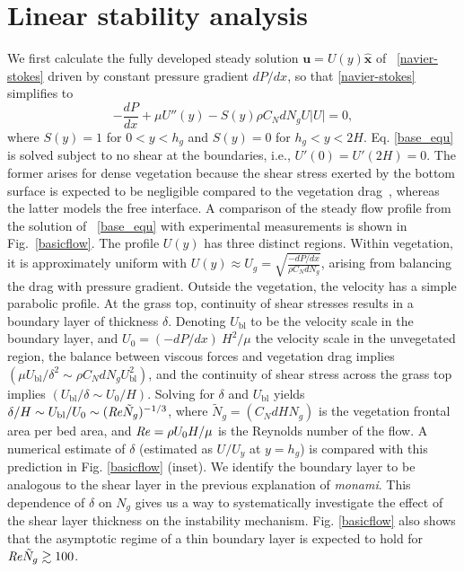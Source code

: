 \documentclass{jfm}
\newcommand{\bu}{\mathbf{u}}
\newcommand{\hg}{h_g}
\newcommand{\Ndg}{\tilde{N}_g}
\newcommand{\monami}{\textit{monami}}
\newcommand{\ubl}{U_\text{bl}}
\newcommand{\ReyNdg}{{\Rey\Ndg}}
\begin{document}
\section{Linear stability analysis}
We first calculate the fully developed steady solution $\bu = U(y)\boldsymbol{\hat{x}}$ of ~\eqref{navier-stokes} driven by constant pressure gradient $dP/dx$, so that \eqref{navier-stokes} simplifies to
\begin{equation}
 -\frac{dP}{dx}+\mu U''(y) -S(y) \rho C_N d N_gU |U|=0,
\label{base_equ}
\end{equation}
where $S(y)=1$ for $0<y<\hg$ and $S(y)=0$ for $\hg< y< 2H$. 
Eq. \eqref{base_equ} is solved subject to no shear at the boundaries, i.e., $U'(0) = U'(2H) = 0$.
The former arises for dense vegetation because the shear stress exerted by the bottom surface is expected to be negligible compared to the vegetation drag~\citep{Nepf00}, whereas the latter models the free interface. 
A comparison of the steady flow profile from the solution of ~\eqref{base_equ} with experimental measurements is shown in Fig.~\ref{basicflow}.
The profile $U(y)$ has three distinct regions.
Within vegetation, it is approximately uniform with $ U(y) \approx U_g = \sqrt{\frac{-dP/dx}{\rho C_N dN_g}}$, arising from balancing the drag with pressure gradient. 
Outside the vegetation, the velocity has a simple parabolic profile. %
At the grass top, continuity of shear stresses results in a boundary layer of thickness $\delta$. 
Denoting $\ubl$ to be the velocity scale in the boundary layer, and $U_0 = {(-dP/dx)~H^2}/{\mu}$ the velocity scale in the unvegetated region, the balance between viscous forces and vegetation drag implies $(\mu \ubl/\delta^2 \sim \rho C_N d N_g \ubl^2)$, and the continuity of shear stress across the grass top implies $(\ubl/\delta \sim U_0/H)$.
Solving for $\delta$ and $\ubl$ yields $\delta/H \sim \ubl/U_0 \sim (\ReyNdg)^{-1/3}$, where $\Ndg = \left(C_N d H N_g\right)$ is the vegetation frontal area per bed area, and $\mbox{\textit{Re}}=\rho U_0 H/\mu$ is the Reynolds number of the flow. 
A numerical estimate of $\delta$ (estimated as $U/U_y$ at $y=\hg$) is compared with this prediction in Fig. \ref{basicflow} (inset).
We identify the boundary layer to be analogous to the shear layer \citep{Ghisal02,Nepf04} in the previous explanation of \monami.
This dependence of $\delta$ on $N_g$ gives us a way to systematically investigate the effect of the shear layer thickness on the instability mechanism.
Fig. \ref{basicflow} also shows that the asymptotic regime of a thin boundary layer is expected to hold for $\ReyNdg \gtrsim 100$. 
\end{document}
